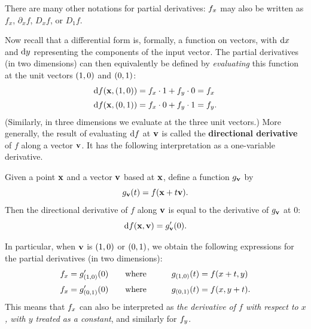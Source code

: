 There are many other notations for partial derivatives: ${f}_{x}$ may also be written as $f_x$, $\partial_x f$, $D_x f$, or $D_1 f$.

Now recall that a differential form is, formally, a function on vectors, with ${\mathrm{d} x}$ and ${\mathrm{d} y}$ representing the components of the input vector.
The partial derivatives (in two dimensions) can then equivalently be defined by \emph{evaluating} this function at the unit vectors $(1,0)$ and $(0,1)$:
\begin{align*}
  {\ensuremath{\mathrm{d} f}}(\mathbf{x},(1,0)) &= {f}_{x}\cdot 1 + {f}_{y}\cdot 0 = {f}_{x}\\[2pt]
  {\ensuremath{\mathrm{d} f}}(\mathbf{x},(0,1)) &= {f}_{x}\cdot 0 + {f}_{y}\cdot 1 = {f}_{y}.
\end{align*}
(Similarly, in three dimensions we evaluate at the three unit vectors.)
More generally, the result of evaluating ${\mathrm{d} f}$ at $\mathbf{v}$ is called the \textbf{directional derivative} of $f$ along a vector $\mathbf{v}$.
It has the following interpretation as a one-variable derivative.

\begin{thm}
  Given a point $\mathbf{x}$ and a vector $\mathbf{v}$ based at $\mathbf{x}$, define a function $g_{\mathbf{v}}$ by
  \[ g_{\mathbf{v}}(t) = f(\mathbf{x} + t \mathbf{v}). \]
  Then the directional derivative of $f$ along $\mathbf{v}$ is equal to the derivative of $g_{\mathbf{v}}$ at $0$:
  \[ {\mathrm{d} f}(\mathbf{x},\mathbf{v}) = g_{\mathbf{v}}'(0). \]
\end{thm}

In particular, when $\mathbf{v}$ is $(1,0)$ or $(0,1)$, we obtain the following expressions for the partial derivatives (in two dimensions):
\begin{alignat*}{2}
  {f}_{x} &= g_{(1,0)}'(0) \qquad\text{where}\qquad & g_{(1,0)}(t) &= f(x+t,y)\\[2pt]
  {f}_{x} &= g_{(0,1)}'(0) \qquad\text{where}\qquad & g_{(0,1)}(t) &= f(x,y+t).
\end{alignat*}
This means that ${f}_{x}$ can also be interpreted as \emph{the derivative of $f$ with respect to $x$, with $y$ treated as a constant}, and similarly for ${f}_{y}$.

